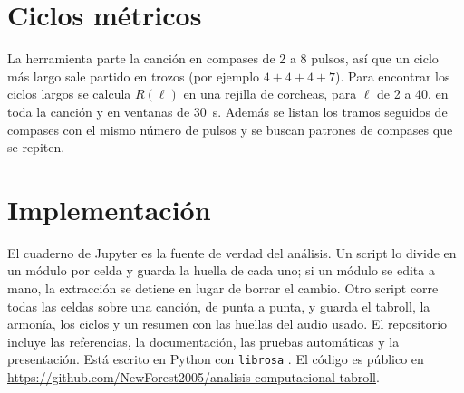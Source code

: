 \section{Ciclos métricos}

La herramienta parte la canción en compases de 2 a 8 pulsos, así que un ciclo más largo sale partido en trozos (por
ejemplo $4 + 4 + 4 + 7$). Para encontrar los ciclos largos se calcula $R(\ell)$ en una rejilla de corcheas, para $\ell$
de 2 a 40, en toda la canción y en ventanas de 30~s. Además se listan los tramos seguidos de compases con el mismo número
de pulsos y se buscan patrones de compases que se repiten.

\section{Implementación}

El cuaderno de Jupyter es la fuente de verdad del análisis. Un script lo divide en un módulo por celda y guarda la huella
de cada uno; si un módulo se edita a mano, la extracción se detiene en lugar de borrar el cambio. Otro script corre todas
las celdas sobre una canción, de punta a punta, y guarda el tabroll, la armonía, los ciclos y un resumen con las huellas
del audio usado. El repositorio incluye las referencias, la documentación, las pruebas automáticas y la presentación. Está
escrito en Python con \texttt{librosa} \citep{mcfee2015}. El código es público en
\url{https://github.com/NewForest2005/analisis-computacional-tabroll}.
